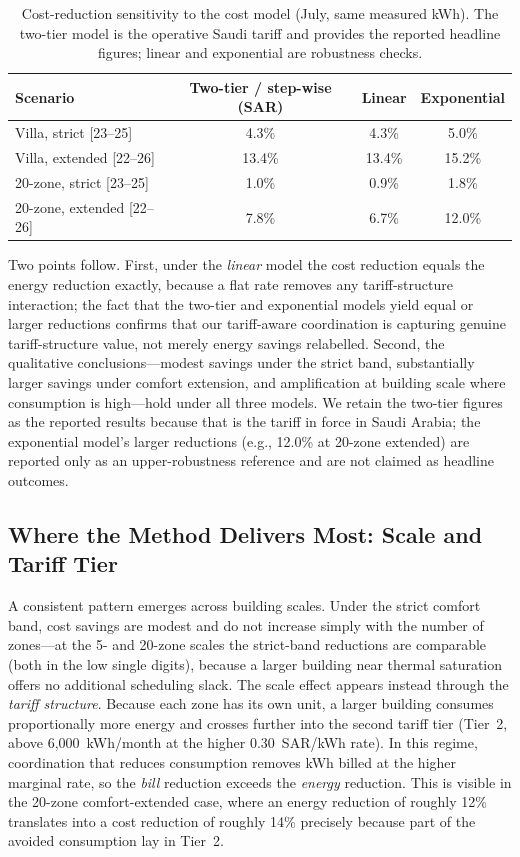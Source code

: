 \documentclass[12pt,a4paper]{article}
\begin{document}
\begin{table}[H]
\centering
\caption{Cost-reduction sensitivity to the cost model (July, same measured kWh). The two-tier model is the operative Saudi tariff and provides the reported headline figures; linear and exponential are robustness checks.}
\label{tab:costmodel}
\begin{tabular*}{\textwidth}{@{\extracolsep{\fill}}lccc@{}}
\toprule
\textbf{Scenario} & \textbf{Two-tier / step-wise (SAR)} & \textbf{Linear} & \textbf{Exponential} \\
\midrule
Villa, strict [23--25] & 4.3\% & 4.3\% & 5.0\% \\
Villa, extended [22--26] & 13.4\% & 13.4\% & 15.2\% \\
20-zone, strict [23--25] & 1.0\% & 0.9\% & 1.8\% \\
20-zone, extended [22--26] & 7.8\% & 6.7\% & 12.0\% \\
\bottomrule
\end{tabular*}
\end{table}

Two points follow. First, under the \emph{linear} model the cost reduction equals the energy reduction exactly, because a flat rate removes any tariff-structure interaction; the fact that the two-tier and exponential models yield equal or larger reductions confirms that our tariff-aware coordination is capturing genuine tariff-structure value, not merely energy savings relabelled. Second, the qualitative conclusions---modest savings under the strict band, substantially larger savings under comfort extension, and amplification at building scale where consumption is high---hold under all three models. We retain the two-tier figures as the reported results because that is the tariff in force in Saudi Arabia; the exponential model's larger reductions (e.g., 12.0\% at 20-zone extended) are reported only as an upper-robustness reference and are not claimed as headline outcomes.

\subsection{Where the Method Delivers Most: Scale and Tariff Tier}
\label{sec:scale_finding}

A consistent pattern emerges across building scales. Under the strict comfort band, cost savings are modest and do not increase simply with the number of zones---at the 5- and 20-zone scales the strict-band reductions are comparable (both in the low single digits), because a larger building near thermal saturation offers no additional scheduling slack. The scale effect appears instead through the \emph{tariff structure}. Because each zone has its own unit, a larger building consumes proportionally more energy and crosses further into the second tariff tier (Tier~2, above 6{,}000~kWh/month at the higher 0.30~SAR/kWh rate). In this regime, coordination that reduces consumption removes kWh billed at the higher marginal rate, so the \emph{bill} reduction exceeds the \emph{energy} reduction. This is visible in the 20-zone comfort-extended case, where an energy reduction of roughly 12\% translates into a cost reduction of roughly 14\% precisely because part of the avoided consumption lay in Tier~2.
\end{document}
